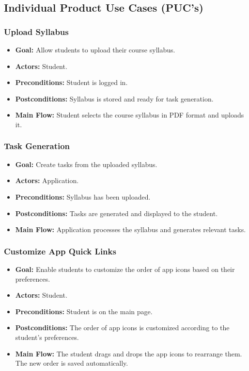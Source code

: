 \documentclass[12pt]{article}
\begin{document}
\subsection{Individual Product Use Cases (PUC’s)}

\subsubsection{Upload Syllabus}
\begin{itemize}
    \item \textbf{Goal:} Allow students to upload their course syllabus.
    \item \textbf{Actors:} Student.
    \item \textbf{Preconditions:} Student is logged in.
    \item \textbf{Postconditions:} Syllabus is stored and ready for task generation.
    \item \textbf{Main Flow:} Student selects the course syllabus in PDF format and uploads it.
\end{itemize}

\subsubsection{Task Generation}
\begin{itemize}
    \item \textbf{Goal:} Create tasks from the uploaded syllabus.
    \item \textbf{Actors:} Application.
    \item \textbf{Preconditions:} Syllabus has been uploaded.
    \item \textbf{Postconditions:} Tasks are generated and displayed to the student.
    \item \textbf{Main Flow:} Application processes the syllabus and generates relevant tasks.
\end{itemize}


\subsubsection{Customize App Quick Links}
\begin{itemize}
    \item \textbf{Goal:} Enable students to customize the order of app icons based on their preferences.
    \item \textbf{Actors:} Student.
    \item \textbf{Preconditions:} Student is on the main page.
    \item \textbf{Postconditions:} The order of app icons is customized according to the student's preferences.
    \item \textbf{Main Flow:} The student drags and drops the app icons to rearrange them. The new order is saved automatically.
\end{itemize}
\end{document}
